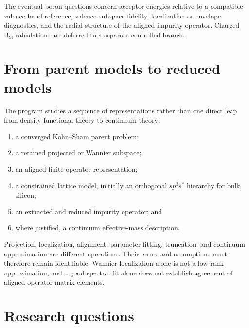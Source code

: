 The eventual boron questions concern acceptor energies relative to a
compatible valence-band reference, valence-subspace fidelity, localization or
envelope diagnostics, and the radial structure of the aligned impurity
operator. Charged $\mathrm{B}_{\mathrm{Si}}^{-}$ calculations are deferred to
a separate controlled branch.

\section{From parent models to reduced models}

The program studies a sequence of representations rather than one direct leap
from density-functional theory to continuum theory:
\begin{enumerate}
    \item a converged Kohn--Sham parent problem;
    \item a retained projected or Wannier subspace;
    \item an aligned finite operator representation;
    \item a constrained lattice model, initially an orthogonal
          $sp^3s^{\ast}$ hierarchy for bulk silicon;
    \item an extracted and reduced impurity operator; and
    \item where justified, a continuum effective-mass description.
\end{enumerate}

Projection, localization, alignment, parameter fitting, truncation, and
continuum approximation are different operations. Their errors and assumptions
must therefore remain identifiable. Wannier localization alone is not a
low-rank approximation, and a good spectral fit alone does not establish
agreement of aligned operator matrix elements.

\section{Research questions}

